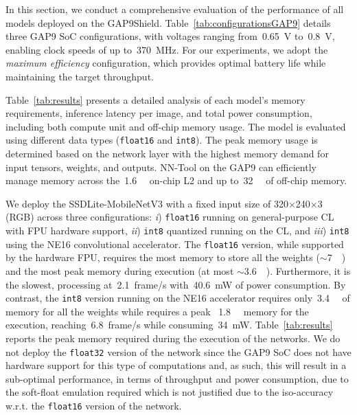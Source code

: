In this section, we conduct a comprehensive evaluation of the performance of all models deployed on the GAP9Shield. 
Table~\ref{tab:configurationsGAP9} details three GAP9 SoC configurations, with voltages ranging from~\SI{0.65}{\volt} to~\SI{0.8}{\volt}, enabling clock speeds of up to~\SI{370}{\mega\hertz}. 
For our experiments, we adopt the \textit{maximum efficiency} configuration, which provides optimal battery life while maintaining the target throughput.


Table~\ref{tab:results} presents a detailed analysis of each model’s memory requirements, inference latency per image, and total power consumption, including both compute unit and off-chip memory usage. 
The model is evaluated using different data types (\texttt{float16} and \texttt{int8}).
The peak memory usage is determined based on the network layer with the highest memory demand for input tensors, weights, and outputs. 
NN-Tool on the GAP9 can efficiently manage memory across the~\SI{1.6}{\mega\byte} on-chip L2 and up to~\SI{32}{\mega\byte} of off-chip memory.

We deploy the SSDLite-MobileNetV3 with a fixed input size of 320$\times$240$\times$3 (RGB) across three configurations: \textit{i}) \texttt{float16} running on general-purpose CL with FPU hardware support, \textit{ii}) \texttt{int8} quantized running on the CL, and \textit{iii}) \texttt{int8} using the NE16 convolutional accelerator. 
The \texttt{float16} version, while supported by the hardware FPU, requires the most memory to store all the weights ($\sim$\SI{7}{\mega\byte}) and the most peak memory during execution (at most $\sim$\SI{3.6}{\mega\byte}). Furthermore, it is the slowest, processing at~\SI{2.1}{frame/\second} with~\SI{40.6}{\milli\watt} of power consumption. 
By contrast, the \texttt{int8} version running on the NE16 accelerator requires only~\SI{3.4}{\mega\byte} of memory for all the weights while requires a peak ~\SI{1.8}{\mega\byte} memory for the execution, reaching~\SI{6.8}{frame/\second} while consuming~\SI{34}{\milli\watt}.
Table~\ref{tab:results} reports the peak memory required during the execution of the networks.
We do not deploy the \texttt{float32} version of the network since the GAP9 SoC does not have hardware support for this type of computations and, as such, this will result in a sub-optimal performance, in terms of throughput and power consumption, due to the soft-float emulation required which is not justified due to the iso-accuracy w.r.t. the \texttt{float16} version of the network.

